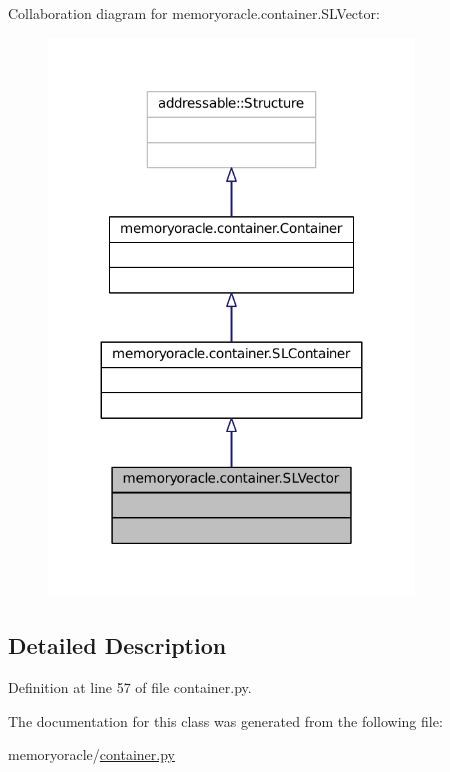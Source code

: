 Collaboration diagram for memoryoracle.\+container.\+S\+L\+Vector\+:\nopagebreak
\begin{figure}[H]
\begin{center}
\leavevmode
\includegraphics[width=275pt]{classmemoryoracle_1_1container_1_1SLVector__coll__graph}
\end{center}
\end{figure}


\subsection{Detailed Description}


Definition at line 57 of file container.\+py.



The documentation for this class was generated from the following file\+:\begin{DoxyCompactItemize}
\item 
memoryoracle/\hyperlink{container_8py}{container.\+py}\end{DoxyCompactItemize}

